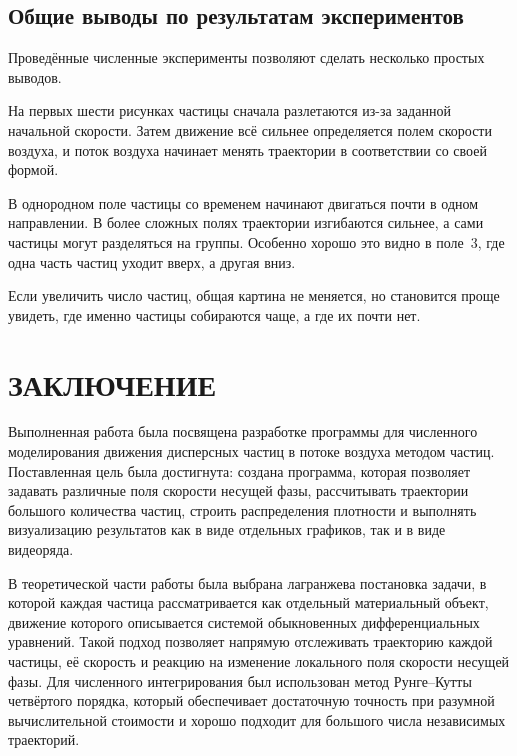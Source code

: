 \documentclass[14pt,a4paper]{extarticle}
\numberwithin{figure}{section}
\numberwithin{table}{section}
\begin{document}
\subsection{Общие выводы по результатам экспериментов}

Проведённые численные эксперименты позволяют сделать несколько простых выводов.

На первых шести рисунках частицы сначала разлетаются из-за заданной начальной
скорости. Затем движение всё сильнее определяется полем скорости воздуха,
и поток воздуха начинает менять траектории в соответствии со своей формой.

В однородном поле частицы со временем начинают двигаться почти в одном
направлении. В более сложных полях траектории изгибаются сильнее, а сами
частицы могут разделяться на группы. Особенно хорошо это видно в поле~3,
где одна часть частиц уходит вверх, а другая вниз.

Если увеличить число частиц, общая картина не меняется, но становится проще
увидеть, где именно частицы собираются чаще, а где их почти нет.


\FloatBarrier
\clearpage
\section*{ЗАКЛЮЧЕНИЕ}

Выполненная работа была посвящена разработке программы для
численного моделирования движения дисперсных частиц в потоке воздуха методом
частиц. Поставленная цель была достигнута: создана программа, которая позволяет
задавать различные поля скорости несущей фазы, рассчитывать траектории большого
количества частиц, строить распределения плотности и выполнять визуализацию
результатов как в виде отдельных графиков, так и в виде видеоряда.

В теоретической части работы была выбрана лагранжева постановка задачи, в которой
каждая частица рассматривается как отдельный материальный объект, движение которого
описывается системой обыкновенных дифференциальных уравнений. Такой подход позволяет
напрямую отслеживать траекторию каждой частицы, её скорость и реакцию на изменение
локального поля скорости несущей фазы.
Для численного интегрирования был использован метод Рунге--Кутты четвёртого порядка,
который обеспечивает достаточную точность при разумной вычислительной стоимости и
хорошо подходит для большого числа независимых траекторий.
\end{document}
